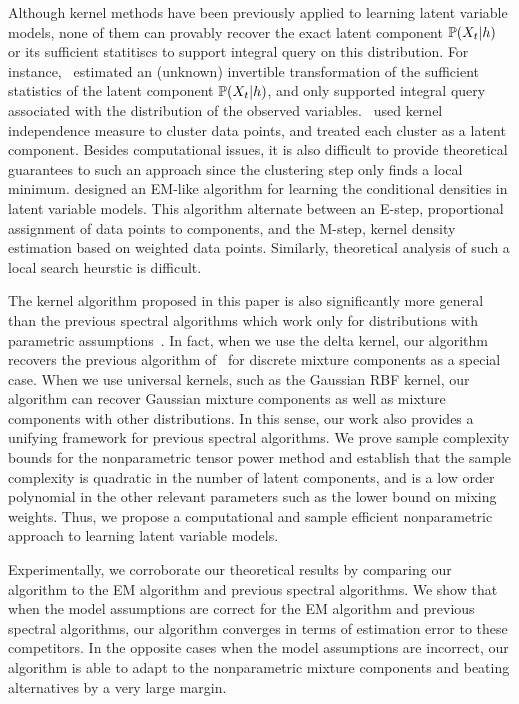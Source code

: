 \documentclass{article}
\begin{document}
Although kernel methods have been previously applied to learning latent variable models, none of them can provably recover the exact latent component $\mathbb{P}(X_t|h)$ or its sufficient statitiscs to support integral query on this distribution. For instance, \citet{SonParXin11, SonDai13}~estimated an (unknown) invertible transformation of the sufficient statistics of the latent component $\mathbb{P}(X_t|h)$, and only supported integral query associated with the distribution of the observed variables. \citet{SgoJanPetSch13}~used kernel independence measure to cluster data points, and treated each cluster as a latent component. Besides computational issues, it is also difficult to provide theoretical guarantees to such an approach since the clustering step only finds a local minimum. \citet{BenChaHun09} designed an EM-like algorithm for
learning the conditional densities in latent variable models. This algorithm alternate between an E-step, proportional assignment of data points to components, and the M-step, kernel density estimation based on weighted data points. Similarly, theoretical analysis of such a local search heurstic is difficult.

The kernel algorithm proposed in this paper is also significantly more general than the previous spectral algorithms which work only for distributions with parametric assumptions~\cite{AnandkumarEtal:tensor12,HsuKak13}. In fact, when we use the delta kernel, our algorithm recovers the previous algorithm of~\citet{AnandkumarEtal:tensor12} for discrete mixture components as a special case. When we use universal kernels, such as the Gaussian RBF kernel, our algorithm can recover Gaussian mixture components as well as mixture components with other distributions. In this sense, our work also provides a unifying framework for previous spectral algorithms. We prove sample complexity bounds for the nonparametric tensor power method and establish  that the sample complexity is quadratic in the number of latent components, and is a low order polynomial in the other relevant parameters such as the lower bound on mixing weights. Thus, we propose a computational and sample efficient nonparametric approach to learning
latent variable models.

Experimentally, we corroborate our theoretical results by comparing our algorithm to the EM algorithm and previous spectral algorithms. We show that when the model assumptions are correct for the EM algorithm and previous spectral algorithms, our algorithm converges in terms of estimation error to these competitors. In the opposite cases when the model assumptions are incorrect, our algorithm is able to adapt to the nonparametric mixture components and beating alternatives by a very large margin.
\end{document}
